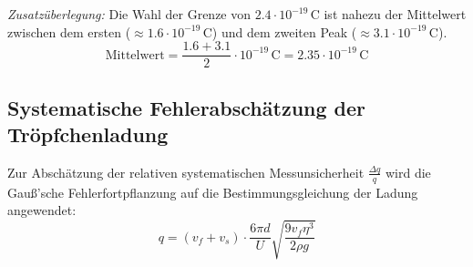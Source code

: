 \documentclass[12pt,a4paper,titlepage]{scrartcl}
\numberwithin{equation}{section}
\numberwithin{table}{section}
\numberwithin{figure}{section}
\begin{document}
\medskip
\noindent
\textit{Zusatzüberlegung:} 
Die Wahl der Grenze von $2.4 \cdot 10^{-19}\,\text{C}$ ist nahezu der Mittelwert zwischen dem ersten
($\approx 1.6 \cdot 10^{-19}\,\text{C}$) und dem zweiten Peak ($\approx 3.1 \cdot 10^{-19}\,\text{C}$).
\begin{equation}
    \text{Mittelwert} = \frac{1.6 + 3.1}{2} \cdot 10^{-19}\,\text{C} = 2.35 \cdot 10^{-19}\,\text{C}
\end{equation}



\subsection{Systematische Fehlerabschätzung der Tröpfchenladung}

Zur Abschätzung der relativen systematischen Messunsicherheit $\frac{\Delta q}{q}$ wird die Gauß'sche Fehlerfortpflanzung auf die Bestimmungsgleichung der Ladung angewendet:
\begin{equation}
    q = (v_f + v_s) \cdot \frac{6\pi d}{U} \sqrt{\frac{9 v_f \eta^3}{2\rho g}}
    \label{eq:q_exakt}
\end{equation}
\end{document}
